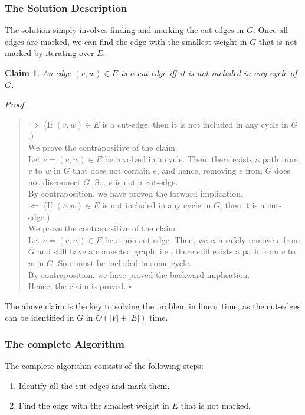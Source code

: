 \documentclass[12pt]{report}
\newtheorem{claim}{Claim}
\begin{document}
    \subsubsection*{The Solution Description}
    The solution simply involves finding and marking the cut-edges in $G$.
    Once all edges are marked, we can find the edge with the smallest weight in $G$ that is not marked by iterating over $E$.

    \begin{claim}
        An edge $(v, w) \in E$ is a cut-edge iff it is not included in any cycle of $G$.
    \end{claim}
    \textit{Proof.}
    \begin{quote}
        $\Rightarrow$ (If $(v, w) \in E$ is a cut-edge, then it is not included in any cycle in $G$.) \\
        We prove the contrapositive of the claim. \\
        Let $e = (v, w) \in E$ be involved in a cycle. Then, there exists a path from $v$ to $w$ in $G$
        that does not contain $e$, and hence, removing $e$ from $G$ does not disconnect $G$.
        So, $e$ is not a cut-edge. \\
        By contraposition, we have proved the forward implication.
        \vspace*{7.5pt} \\
        $\Leftarrow$ (If $(v, w) \in E$ is not included in any cycle in $G$, then it is a cut-edge.) \\
        We prove the contrapositive of the claim. \\
        Let $e = (v, w) \in E$ be a non-cut-edge. Then, we can safely remove $e$ from $G$ and still have a connected graph,
        i.e., there still exists a path from $v$ to $w$ in $G$.
        So $e$ must be included in some cycle. \\
        By contraposition, we have proved the backward implication.
        \vspace*{7.5pt} \\
        Hence, the claim is proved. \hfill $\square$
    \end{quote}
    The above claim is the key to solving the problem in linear time, as the cut-edges can be identified in $G$ in $O(|V|+|E|)$ time.

    \subsubsection*{The complete Algorithm}
    The complete algorithm consists of the following steps:
    \begin{enumerate}
        \item Identify all the cut-edges and mark them.
        \item Find the edge with the smallest weight in $E$ that is not marked.
    \end{enumerate}
\end{document}
